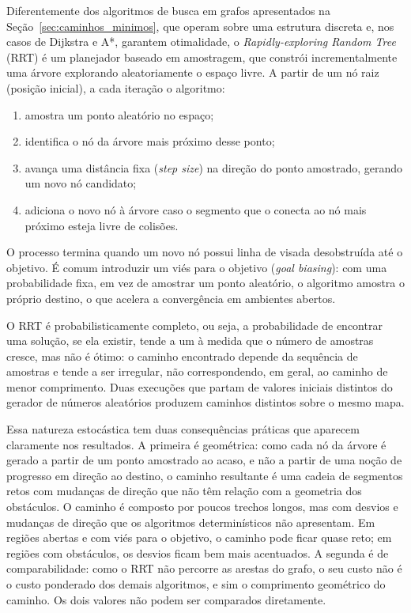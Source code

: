 \documentclass[
    12pt,
    openright,
    oneside,
    a4paper,
    english,
    brazil
]{abntex2}
\begin{document}
Diferentemente dos algoritmos de busca em grafos apresentados na Seção~\ref{sec:caminhos_minimos}, que operam sobre uma estrutura discreta e, nos casos de Dijkstra e A*, garantem otimalidade, o \textit{Rapidly-exploring Random Tree} (RRT) \cite{lavalle1998, xu2024} é um planejador baseado em amostragem, que constrói incrementalmente uma árvore explorando aleatoriamente o espaço livre. A partir de um nó raiz (posição inicial), a cada iteração o algoritmo:

\begin{enumerate}
    \item amostra um ponto aleatório no espaço;
    \item identifica o nó da árvore mais próximo desse ponto;
    \item avança uma distância fixa (\textit{step size}) na direção do ponto amostrado, gerando um novo nó candidato;
    \item adiciona o novo nó à árvore caso o segmento que o conecta ao nó mais próximo esteja livre de colisões.
\end{enumerate}

O processo termina quando um novo nó possui linha de visada desobstruída até o objetivo. É comum introduzir um viés para o objetivo (\textit{goal biasing}): com uma probabilidade fixa, em vez de amostrar um ponto aleatório, o algoritmo amostra o próprio destino, o que acelera a convergência em ambientes abertos.

O RRT é probabilisticamente completo, ou seja, a probabilidade de encontrar uma solução, se ela existir, tende a um à medida que o número de amostras cresce, mas não é ótimo: o caminho encontrado depende da sequência de amostras e tende a ser irregular, não correspondendo, em geral, ao caminho de menor comprimento. Duas execuções que partam de valores iniciais distintos do gerador de números aleatórios produzem caminhos distintos sobre o mesmo mapa.

Essa natureza estocástica tem duas consequências práticas que aparecem claramente nos resultados. A primeira é geométrica: como cada nó da árvore é gerado a partir de um ponto amostrado ao acaso, e não a partir de uma noção de progresso em direção ao destino, o caminho resultante é uma cadeia de segmentos retos com mudanças de direção que não têm relação com a geometria dos obstáculos. O caminho é composto por poucos trechos longos, mas com desvios e mudanças de direção que os algoritmos determinísticos não apresentam. Em regiões abertas e com viés para o objetivo, o caminho pode ficar quase reto; em regiões com obstáculos, os desvios ficam bem mais acentuados. A segunda é de comparabilidade: como o RRT não percorre as arestas do grafo, o seu custo não é o custo ponderado dos demais algoritmos, e sim o comprimento geométrico do caminho. Os dois valores não podem ser comparados diretamente.
\end{document}
